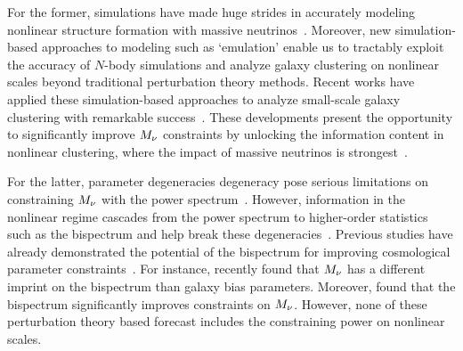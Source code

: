 For the former, simulations have made huge strides in accurately modeling 
nonlinear structure formation with massive neutrinos~\citep[\eg][]{brandbyge2008, 
villaescusa-navarro2013, castorina2015, adamek2017, emberson2017, banerjee2018, 
villaescusa-navarro2018a, yoshikawa2020, villaescusa-navarro2020a}. Moreover, new simulation-based
approaches to modeling such as `emulation' enable us to tractably exploit the accuracy of 
$N$-body simulations and analyze galaxy clustering on nonlinear scales beyond
traditional perturbation theory methods. Recent works have applied
these simulation-based approaches to analyze small-scale galaxy clustering with
remarkable success~\citep[\eg][]{heitmann2009a, kwan2015, euclidcollaboration2018, lange2019, zhai2019, wibking2019}. 
These developments present the opportunity to significantly improve $M_\nu$
constraints by unlocking the information content in nonlinear clustering, where
the impact of massive neutrinos is strongest~\citep[\eg][]{brandbyge2008,
saito2008, wong2008, saito2009, viel2010, agarwal2011, marulli2011, bird2012,
castorina2015, banerjee2016, upadhye2016, banerjee2020, allys2020, massara2020,
uhlemann2020}.

For the latter, parameter degeneracies degeneracy pose serious limitations on 
constraining 
$M_\nu$ with the power spectrum~\citep{villaescusa-navarro2018a}. However, 
information in the nonlinear regime cascades
from the power spectrum to higher-order statistics such as the bispectrum 
and help break these degeneracies~\citep{hahn2020}. Previous studies have 
already demonstrated the potential of the bispectrum for improving cosmological 
parameter constraints~\citep{sefusatti2005, sefusatti2006, chan2017, yankelevich2019,
agarwal2020, kamalinejad2020}.
For instance, \cite{kamalinejad2020} recently found that $M_\nu$ has a different 
imprint on the bispectrum than galaxy bias parameters.
Moreover, \cite{chudaykin2019} found that the bispectrum significantly improves constraints on $M_\nu$.
However, none of these perturbation theory based forecast includes the
constraining power on nonlinear scales. 


